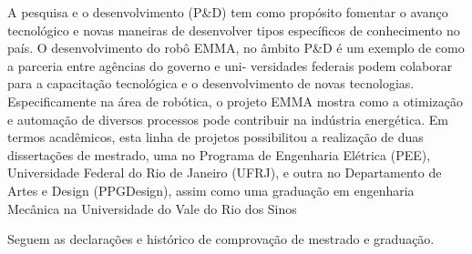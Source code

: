 A pesquisa e o desenvolvimento (P\&D) tem como propósito fomentar o avanço
tecnológico e novas maneiras de desenvolver tipos específicos de conhecimento
no país. O desenvolvimento do robô EMMA, no âmbito P\&D é um exemplo de como a
parceria entre agências do governo e uni- versidades federais podem colaborar
para a capacitação tecnológica e o desenvolvimento de novas tecnologias.
Especificamente na área de robó\-tica, o projeto EMMA mostra como a otimização e
automação de diversos processos pode contribuir na indústria
energética. Em termos acadêmicos, esta linha de projetos possibilitou a
realização de duas
dissertações de mestrado, uma no Programa de Engenharia Elétrica (PEE),
Universidade Federal do Rio de Janeiro (UFRJ), e outra no Departamento
de Artes e Design (PPGDesign), assim como uma graduação em engenharia
Mecânica na Universidade do Vale do Rio dos Sinos

Seguem as declarações e histórico de comprovação de mestrado e graduação.


%


%
%




